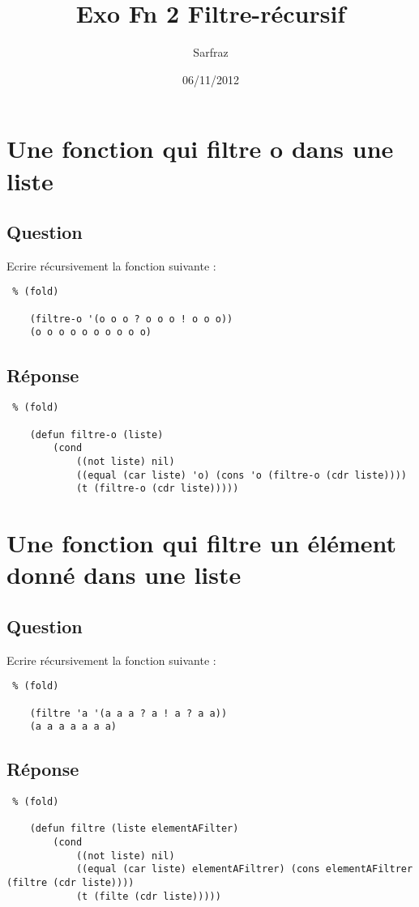 \documentclass[a4paper, 11pt]{article}
\title{Exo Fn 2 Filtre-récursif}
\author{Sarfraz \bsc{kapasi}}
\date{06/11/2012}
\begin{document}
%
\maketitle
%
\section{Une fonction qui filtre o dans une liste} %
\label{sec:Une fonction qui filtre o dans une liste}
\subsection{Question} %
\label{sub:Question}
Ecrire récursivement la fonction suivante :
\begin{lstlisting} % (fold)

    (filtre-o '(o o o ? o o o ! o o o))
    (o o o o o o o o o o)
\end{lstlisting}
\subsection{Réponse} %
\label{sub:Réponse}
\begin{lstlisting} % (fold)

    (defun filtre-o (liste)
        (cond
            ((not liste) nil)
            ((equal (car liste) 'o) (cons 'o (filtre-o (cdr liste))))
            (t (filtre-o (cdr liste)))))
\end{lstlisting}


\section{Une fonction qui filtre un élément donné dans une liste} %
\label{sec:Une fonction qui filtre un élément donné dans une liste}
\subsection{Question} %
\label{sub:Question}
Ecrire récursivement la fonction suivante :
\begin{lstlisting} % (fold)

    (filtre 'a '(a a a ? a ! a ? a a))
    (a a a a a a a)
\end{lstlisting}
\subsection{Réponse} %
\label{sub:Réponse}
\begin{lstlisting} % (fold)

    (defun filtre (liste elementAFilter)
        (cond
            ((not liste) nil)
            ((equal (car liste) elementAFiltrer) (cons elementAFiltrer (filtre (cdr liste))))
            (t (filte (cdr liste)))))
\end{lstlisting}
\end{document}
